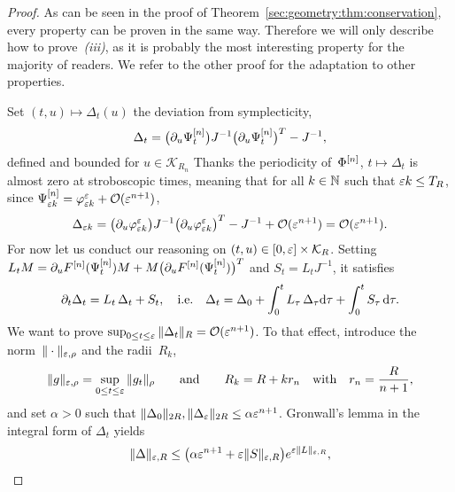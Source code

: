 \begin{proof}
As can be seen in the proof of
Theorem~\ref{sec:geometry:thm:conservation}, every property can be proven
in the same way. Therefore we will only describe how to
prove~\textit{(iii)}, as it is probably the most interesting property for
the majority of readers. We refer to the other proof for the adaptation to
other properties. 

Set $(t,u) \mapsto \Delta_t(u)$ the deviation from symplecticity, 
\begin{equation*}
  \Delta_t = \big(\partial_u \Psi_t^{[n]}\big) J^{-1} 
      \big( \partial_u \Psi_t^{[n]} \big) ^T 
    - J^{-1} ,
\end{equation*}
defined and bounded for $u \in \mathcal{K}_{R_n}$ 
Thanks the periodicity of~$\Phi^{[n]}$, $t \mapsto \Delta_t$ is almost zero at
stroboscopic times, meaning that for all $k \in \mathbb{N}$ such that $\varepsilon k \leq
T_R$, since $\Psi^{[n]} _{\varepsilon k} = \varphi^\varepsilon _{\varepsilon k} + \mathcal{O}(
\varepsilon^{n+1})$,
\begin{equation*}
  \Delta_{\varepsilon k} 
  = \big(\partial_u \varphi ^\varepsilon _{\varepsilon k}\big) J^{-1} 
      \big( \partial_u \varphi^\varepsilon _{\varepsilon k} \big) ^T 
    - J^{-1} + \mathcal{O}( \varepsilon^{n+1} )
  = \mathcal{O}( \varepsilon^{n+1} ) .
\end{equation*}
For now let us conduct our reasoning on $(t,u) \in [0,\varepsilon] \times
\mathcal{K}_R$. Setting $L_t M = \partial_u F^{[n]} ( \Psi_t^{[n]} ) M + M \big( \partial_u
F^{[n]} (\Psi_t^{[n]} ) \big)^T $ and $S_t = L_t J^{-1}$, it satisfies
\begin{equation} \label{sec:geometry:eq:ode_Delta}
  \partial_t \Delta_t = L_t\, \Delta_t + S_t,
  \quad\text{i.e.}\quad
  \Delta_t = \Delta_0 + \int_0^t L_\tau\, \Delta_\tau \mathrm{d} \tau 
    + \int_0^t S_\tau \, \mathrm{d} \tau .
\end{equation}
We want to prove $\sup_{0 \leq t \leq \varepsilon} \| \Delta_t \|_R = \mathcal{O}(\varepsilon^{n+1}
)$. To that effect, introduce the norm~$\|\cdot\|_{\varepsilon, \rho}$ and the
radii~$R_k$, 
\begin{equation*}
  \| g \|_{\varepsilon, \rho} = \sup_{0 \leq t \leq \varepsilon} \| g_{t} \|_{\rho}
  \qquad\text{and}\qquad
  R_k = R + k r_n
  \quad\text{with}\quad
  r_n = \frac{R}{n+1} ,
\end{equation*}
and set $\alpha > 0$ such that $\| \Delta_0 \|_{2R}, \| \Delta_\varepsilon
\|_{2R} \leq \alpha \varepsilon^{n+1}$. Gronwall's lemma in the integral form of
$\Delta_t$ yields 
\begin{equation} \label{sec:approx:eq:gronwall}
  \| \Delta \|_{\eps, R} 
  \leq \big( \alpha \eps^{n+1} + \eps \| S \|_{\eps, R} \big)
    e^{\eps \| L \|_{\eps, R}} ,

\end{equation}
\end{proof}
